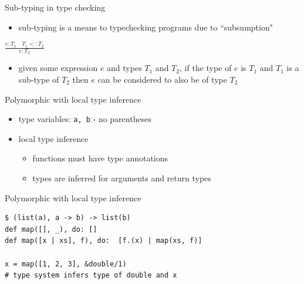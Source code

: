 \documentclass[
  ignorenonframetext,
  aspectratio=169]{beamer}
\newcommand{\passthrough}[1]{#1}
\providecommand{\tightlist}{%
  \setlength{\itemsep}{0pt}\setlength{\parskip}{0pt}}
\begin{document}
\begin{frame}{Sub-typing in type checking}
\label{sub-typing-in-type-checking}
\begin{itemize}
\tightlist
\item
  sub-typing is a means to typechecking programs due to ``subsumption"
\end{itemize}

\huge

\begin{center}
 $\frac{e : T_1 \quad T_1 <: T_2}{e : T_2}$
 \end{center}

\begin{itemize}
\tightlist
\item
  given some expression \(e\) and types \(T_1\) and \(T_2\), if the type
  of \(e\) is \(T_1\) and \(T_1\) is a sub-type of \(T_2\) then \(e\)
  can be considered to also be of type \(T_2\)
\end{itemize}
\end{frame}

\begin{frame}[fragile]{Polymorphic with local type inference}
\label{polymorphic-with-local-type-inference}
\begin{itemize}
\tightlist
\item
  type variables: \passthrough{\lstinline!a, b!} - no parentheses
\item
  local type inference

  \begin{itemize}
  \tightlist
  \item
    functions must have type annotations
  \item
    types are inferred for arguments and return types
  \end{itemize}
\end{itemize}
\end{frame}

\begin{frame}[fragile]{Polymorphic with local type inference}
\label{polymorphic-with-local-type-inference-1}
\begin{lstlisting}
$ (list(a), a -> b) -> list(b)
def map([], _), do: []
def map([x | xs], f), do:  [f.(x) | map(xs, f)]

x = map([1, 2, 3], &double/1)
# type system infers type of double and x
\end{lstlisting}
\end{frame}
\end{document}
